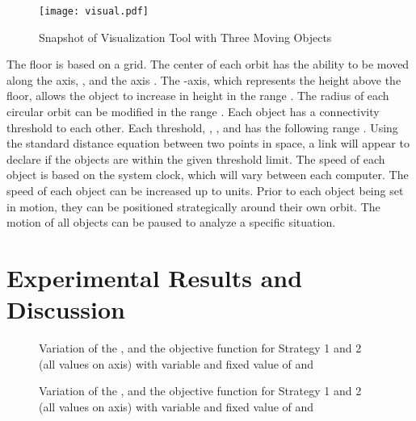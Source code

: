\documentclass[10pt]{IEEEtran}
\begin{document}
\begin{figure}
\centering
\texttt{[image: visual.pdf]}
\caption{Snapshot of Visualization Tool with Three Moving Objects}
\label{fig:viz}
\end{figure}

The floor is based on a  grid. The center of each orbit has the ability to be moved along the  axis, ,  and the  axis . The -axis, which represents the height above the floor, allows the object to increase in height in the range . The radius of each circular orbit can be modified in the range . Each object has a connectivity threshold to each other. Each threshold, , , and  has the following range . Using the standard distance equation between two points in  space, a link will appear to declare if the objects are within the given threshold limit. The speed of each object is based on the system clock, which will vary between each computer. The speed of each object can be increased up to  units. Prior to each object being set in motion, they can be positioned strategically around their own orbit. The motion of all objects can be paused to analyze a specific situation. 

\section{Experimental Results and Discussion}
\label{sec:experiments}

\begin{figure*}
 \centering
 \hfill
 \hfill
 \caption{Variation of the ,  and the objective function for Strategy 1 and 2 (all values on  axis) with variable  and fixed value of  and }
 \label{fig:rs}
\end{figure*}

\begin{figure*}
 \centering
 \hfill
 \hfill
 \caption{Variation of the ,  and the objective function for Strategy 1 and 2 (all values on  axis) with variable  and fixed value of  and }
 \label{fig:h}
\end{figure*}
\end{document}
